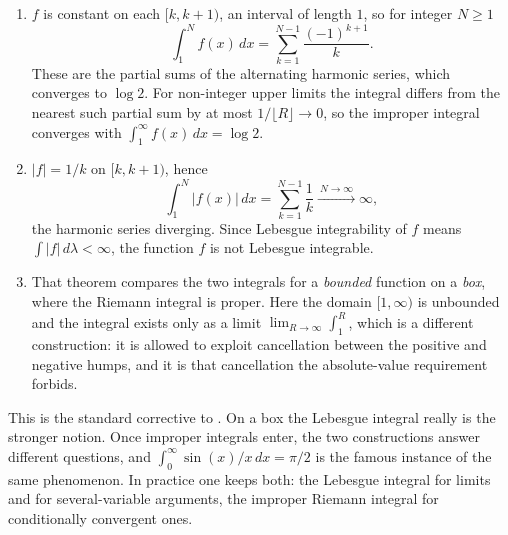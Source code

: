 \begin{exercisesolution}
\label{sol:ai_improper_not_lebesgue}
\begin{enumerate}[label=\textbf{(\alph*)}]
  \item $f$ is constant on each $[k,k+1)$, an interval of length $1$, so for integer $N \ge 1$
    \[\int_1^N f(x)\,dx = \sum_{k=1}^{N-1} \frac{(-1)^{k+1}}{k}.\]
    These are the partial sums of the alternating harmonic series, which converges to $\log 2$.
    For non-integer upper limits the integral differs from the nearest such partial sum by at most
    $1/\lfloor R\rfloor \to 0$, so the improper integral converges with
    $\int_1^\infty f(x)\,dx = \log 2$.

  \item $\lvert f\rvert = 1/k$ on $[k,k+1)$, hence
    \[\int_1^N \lvert f(x)\rvert\,dx = \sum_{k=1}^{N-1}\frac1k \xrightarrow{\ N\to\infty\ } \infty,\]
    the harmonic series diverging. Since Lebesgue integrability of $f$ means
    $\int\lvert f\rvert\,d\lambda < \infty$, the function $f$ is not Lebesgue integrable.

  \item That theorem compares the two integrals for a \emph{bounded} function on a \emph{box},
    where the Riemann integral is proper. Here the domain $[1,\infty)$ is unbounded and the
    integral exists only as a limit $\lim_{R\to\infty}\int_1^R$, which is a different construction:
    it is allowed to exploit cancellation between the positive and negative humps, and it is that
    cancellation the absolute-value requirement forbids.
\end{enumerate}
\begin{remark}
This is the standard corrective to . On a box the Lebesgue
integral really is the stronger notion. Once improper integrals enter, the two constructions
answer different questions, and $\int_0^\infty \sin(x)/x\,dx = \pi/2$ is the famous instance of the
same phenomenon. In practice one keeps both: the Lebesgue integral for limits and for
several-variable arguments, the improper Riemann integral for conditionally convergent ones.
\end{remark}
\end{exercisesolution}

